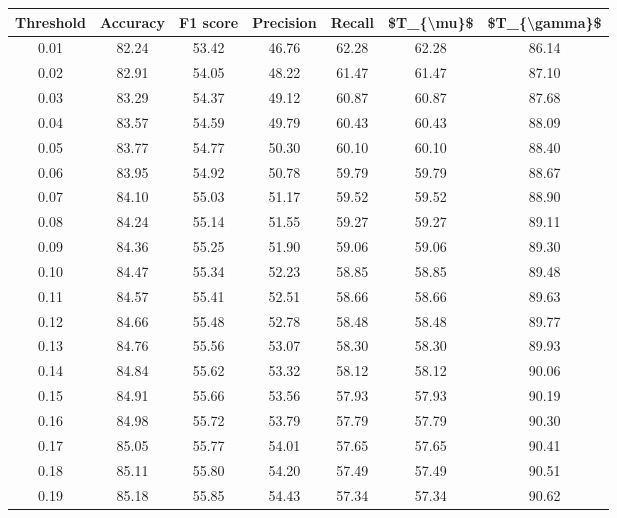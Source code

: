 \begin{tabular}{|c|c|c|c|c|c|c|}
\hline
 Threshold &  Accuracy &  F1 score &  Precision &  Recall &  \$T\_\{\textbackslash mu\}\$ &  \$T\_\{\textbackslash gamma\}\$ \\
\hline
      0.01 &     82.24 &     53.42 &      46.76 &   62.28 &      62.28 &         86.14 \\
      0.02 &     82.91 &     54.05 &      48.22 &   61.47 &      61.47 &         87.10 \\
      0.03 &     83.29 &     54.37 &      49.12 &   60.87 &      60.87 &         87.68 \\
      0.04 &     83.57 &     54.59 &      49.79 &   60.43 &      60.43 &         88.09 \\
      0.05 &     83.77 &     54.77 &      50.30 &   60.10 &      60.10 &         88.40 \\
      0.06 &     83.95 &     54.92 &      50.78 &   59.79 &      59.79 &         88.67 \\
      0.07 &     84.10 &     55.03 &      51.17 &   59.52 &      59.52 &         88.90 \\
      0.08 &     84.24 &     55.14 &      51.55 &   59.27 &      59.27 &         89.11 \\
      0.09 &     84.36 &     55.25 &      51.90 &   59.06 &      59.06 &         89.30 \\
      0.10 &     84.47 &     55.34 &      52.23 &   58.85 &      58.85 &         89.48 \\
      0.11 &     84.57 &     55.41 &      52.51 &   58.66 &      58.66 &         89.63 \\
      0.12 &     84.66 &     55.48 &      52.78 &   58.48 &      58.48 &         89.77 \\
      0.13 &     84.76 &     55.56 &      53.07 &   58.30 &      58.30 &         89.93 \\
      0.14 &     84.84 &     55.62 &      53.32 &   58.12 &      58.12 &         90.06 \\
      0.15 &     84.91 &     55.66 &      53.56 &   57.93 &      57.93 &         90.19 \\
      0.16 &     84.98 &     55.72 &      53.79 &   57.79 &      57.79 &         90.30 \\
      0.17 &     85.05 &     55.77 &      54.01 &   57.65 &      57.65 &         90.41 \\
      0.18 &     85.11 &     55.80 &      54.20 &   57.49 &      57.49 &         90.51 \\
      0.19 &     85.18 &     55.85 &      54.43 &   57.34 &      57.34 &         90.62 \\

\end{tabular}
